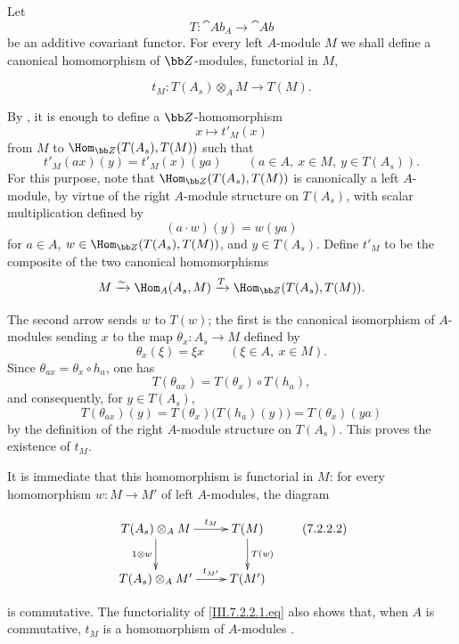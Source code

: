 \begin{env}[7.2.2]
\label{III.7.2.2}
Let
\[
  T:\cat{Ab}_A\longrightarrow\cat{Ab}
\]
be an additive covariant functor.  For every left $A$-module
$M$ we shall define a canonical homomorphism of $\bb Z$-modules,
functorial in $M$,
\begin{env}[7.2.2.1]
\label{III.7.2.2.1}
\[
  t_M:T(A_s)\otimes_A M\longrightarrow T(M).
  \tag{7.2.2.1}\label{III.7.2.2.1.eq}
\]
\end{env}
By , it is enough to define a
$\bb Z$-homomorphism
\[
  x\longmapsto t'_M(x)
\]
from $M$ to $\Hom_{\bb Z}(T(A_s),T(M))$ such that
\[
  t'_M(ax)(y)=t'_M(x)(ya)
  \qquad(a\in A,\ x\in M,\ y\in T(A_s)).
\]
For this purpose, note that
$\Hom_{\bb Z}(T(A_s),T(M))$ is canonically a left $A$-module,
by virtue of the right $A$-module structure on $T(A_s)$, with
scalar multiplication defined by
\[
  (a\cdot w)(y)=w(ya)
\]
for $a\in A$, $w\in\Hom_{\bb Z}(T(A_s),T(M))$, and
$y\in T(A_s)$.  Define $t'_M$ to be the composite of the two
canonical homomorphisms
\[
  M
  \xrightarrow{\sim}
  \Hom_A(A_s,M)
  \xrightarrow{T}
  \Hom_{\bb Z}(T(A_s),T(M)).
\]


The second arrow sends $w$ to $T(w)$; the first is the canonical
isomorphism of $A$-modules sending $x$ to the map
$\theta_x:A_s\to M$ defined by
\[
  \theta_x(\xi)=\xi x
  \qquad(\xi\in A,\ x\in M).
\]
Since $\theta_{ax}=\theta_x\circ h_a$, one has
\[
  T(\theta_{ax})
  =
  T(\theta_x)\circ T(h_a),
\]
and consequently, for $y\in T(A_s)$,
\[
  T(\theta_{ax})(y)
  =
  T(\theta_x)\bigl(T(h_a)(y)\bigr)
  =
  T(\theta_x)(ya)
\]
by the definition of the right $A$-module structure on
$T(A_s)$.  This proves the existence of $t_M$.

It is immediate that this homomorphism is functorial in $M$:
for every homomorphism $w:M\to M'$ of left $A$-modules, the
diagram
\begin{env}[7.2.2.2]
\label{III.7.2.2.2}
\[
\xymatrix{
  T(A_s)\otimes_A M
    \ar[r]^-{t_M}\ar[d]_{1\otimes w}
  & T(M)\ar[d]^{T(w)}
  \\
  T(A_s)\otimes_A M'
    \ar[r]^-{t_{M'}}
  & T(M')
}
\tag{7.2.2.2}\label{III.7.2.2.2.eq}
\]
\end{env}
is commutative.  The functoriality of
\eqref{III.7.2.2.1.eq} also shows that, when $A$ is
commutative, $t_M$ is a homomorphism of $A$-modules
.
\end{env}


